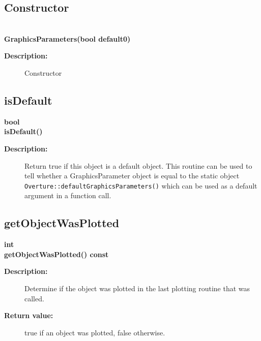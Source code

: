 \subsection{Constructor}
 
\newlength{\GraphicsParametersIncludeArgIndent}
\begin{flushleft} \textbf{%
  \\ 
\settowidth{\GraphicsParametersIncludeArgIndent}{GraphicsParameters(}%
GraphicsParameters(bool default0)
}\end{flushleft}
\begin{description}
\item[{\bf Description:}] 
   Constructor 

\end{description}
\subsection{isDefault}
 
\begin{flushleft} \textbf{%
bool   \\ 
\settowidth{\GraphicsParametersIncludeArgIndent}{isDefault(}%
isDefault()
}\end{flushleft}
\begin{description}
\item[{\bf Description:}] 
   Return true if this object is a default object. 
 This routine can be used to tell whether a GraphicsParameter object is
 equal to the static object {\tt Overture::defaultGraphicsParameters()} which can
 be used as a default argument in a function call.
\end{description}
\subsection{getObjectWasPlotted}
 
\begin{flushleft} \textbf{%
int  \\ 
\settowidth{\GraphicsParametersIncludeArgIndent}{getObjectWasPlotted(}%
getObjectWasPlotted() const
}\end{flushleft}
\begin{description}
\item[{\bf Description:}] 
    Determine if the object was plotted in the last plotting routine
    that was called.
\item[{\bf Return value:}]  true if an object was plotted, false otherwise.

\end{description}
